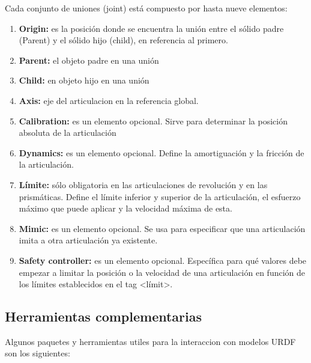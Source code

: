         Cada conjunto de uniones (joint) está compuesto por hasta nueve elementos:
        
         \begin{enumerate}      
            \item \textbf{Origin:} es la posición donde se encuentra la unión entre el sólido padre (Parent) y el sólido hijo (child), en referencia al primero.
            \item \textbf{Parent:} el objeto padre en una unión
            \item \textbf{Child:} en objeto hijo en una unión
            \item \textbf{Axis:} eje del articulacion en la referencia global.
            \item \textbf{Calibration:} es un elemento opcional. Sirve para determinar la posición absoluta de la articulación
            \item \textbf{Dynamics:} es un elemento opcional. Define la amortiguación y la fricción de la articulación.
            \item \textbf{Límite:} sólo obligatoria en las articulaciones de revolución y en las prismáticas. Define el límite inferior y superior de la articulación, el esfuerzo máximo que puede aplicar y la velocidad máxima de esta.
            \item \textbf{Mimic:} es un elemento opcional. Se usa para especificar que una articulación imita a otra articulación ya existente. 
            \item \textbf{Safety controller:} es un elemento opcional. Específica para qué valores debe empezar a limitar la posición o la velocidad de una articulación en función de los límites establecidos en el tag <límit>.
        \end{enumerate}
        
        
    \subsection{Herramientas complementarias}
    
        Algunos paquetes y herramientas utiles para la interaccion con modelos URDF son los siguientes:
      
